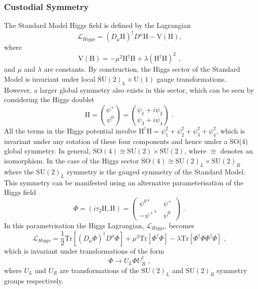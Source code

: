 \subsubsection{Custodial Symmetry}
The Standard Model Higgs field is defined by the Lagrangian
%
\begin{equation}
\mathcal{L}_{Higgs} = (D_{\mu}\text{H})^{\dagger}D^{\mu}\text{H} - \text{V}(\text{H}) \text{,}
\end{equation}
%
\noindent where
%
\begin{equation}
\text{V}(\text{H}) = -\mu^{2}\text{H}^{\dagger}\text{H} + \lambda (\text{H}^{\dagger}\text{H})^{2} \text{ ,}
\end{equation}
%
\noindent and $\mu$ and $\lambda$ are constants.  By construction, the Higgs sector of the Standard Model is invariant under local $\text{SU}(2)_{\text{L}} \times \text{U}(1)$ gauge transformations.  However, a larger global symmetry also exists in this sector, which can be seen by considering the Higgs doublet \cite{Ellis:1991qj}
%
\begin{equation}
\text{H} = \binom{\psi^{+}}{\psi^{0}} = \binom{\psi_{1} + i\psi_{2}}{\psi_{3} + i\psi_{4}} \text{ .}
\end{equation}
%
\noindent All the terms in the Higgs potential involve $\text{H}^{\dagger}\text{H} = \psi_{1}^{2} + \psi_{2}^{2} + \psi_{3}^{2} + \psi_{4}^{2}$, which is invariant under any rotation of these four components and hence under a SO(4) global symmetry.  In general, $\text{SO}(4) \cong \text{SU}(2) \times \text{SU}(2)$, where $\cong$ denotes an isomorphism.  In the case of the Higgs sector $\text{SO}(4) \cong \text{SU}(2)_{L} \times \text{SU}(2)_{R}$ where the $\text{SU}(2)_{L}$ symmetry is the gauged symmetry of the Standard Model.  This symmetry can be manifested using an alternative parameterisation \cite{Andersen:2011yj} of the Higgs field
%
\begin{equation}
\Phi = (i\tau_{2}\text{H}, \text{H}) = 
\begin{pmatrix}
\psi^{0*} & \psi^{+} \\
-\psi^{+*} & \psi^{0}
\end{pmatrix} 
\text{ .}
\end{equation}
%
\noindent In this parametrisation the Higgs Lagrangian, $\mathcal{L}_{Higgs}$, becomes
%
\begin{equation}
\mathcal{L}_{Higgs} =  \frac{1}{2}\text{Tr}[(D_{\mu}\Phi)^{\dagger}D^{\mu}\Phi] + \mu^{2}\text{Tr}[\Phi^{\dagger}\Phi] - \lambda \text{Tr}[\Phi^{\dagger}\Phi\Phi^{\dagger}\Phi] \text{ ,}
\end{equation}
%
\noindent which is invariant under transformations of the form
%
\begin{equation}
\Phi \rightarrow U_{L} \Phi U_{R}^{\dagger} \text{ ,}
\end{equation}
%
\noindent where $U_{L}$ and $U_{R}$ are transformations of the $\text{SU}(2)_{L}$ and $\text{SU}(2)_{R}$ symmetry groups respectively.

